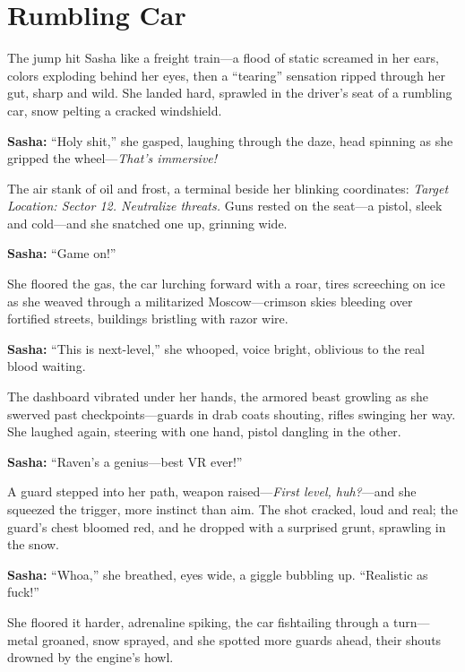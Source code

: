 \documentclass[12pt]{book}
\begin{document}
\section{Rumbling Car}

The jump hit Sasha like a freight train—a flood of static screamed in her ears, colors exploding behind her eyes, then a “tearing” sensation ripped through her gut, sharp and wild. She landed hard, sprawled in the driver’s seat of a rumbling car, snow pelting a cracked windshield. 

\vspace{0.5em}
\textbf{Sasha:} “Holy shit,” she gasped, laughing through the daze, head spinning as she gripped the wheel—\emph{That’s immersive!}

The air stank of oil and frost, a terminal beside her blinking coordinates: \emph{Target Location: Sector 12. Neutralize threats.} Guns rested on the seat—a pistol, sleek and cold—and she snatched one up, grinning wide. 

\vspace{0.5em}
\textbf{Sasha:} “Game on!”

She floored the gas, the car lurching forward with a roar, tires screeching on ice as she weaved through a militarized Moscow—crimson skies bleeding over fortified streets, buildings bristling with razor wire. 

\vspace{0.5em}
\textbf{Sasha:} “This is next-level,” she whooped, voice bright, oblivious to the real blood waiting.

The dashboard vibrated under her hands, the armored beast growling as she swerved past checkpoints—guards in drab coats shouting, rifles swinging her way. She laughed again, steering with one hand, pistol dangling in the other. 

\vspace{0.5em}
\textbf{Sasha:} “Raven’s a genius—best VR ever!”

A guard stepped into her path, weapon raised—\emph{First level, huh?}—and she squeezed the trigger, more instinct than aim. The shot cracked, loud and real; the guard’s chest bloomed red, and he dropped with a surprised grunt, sprawling in the snow. 

\vspace{0.5em}
\textbf{Sasha:} “Whoa,” she breathed, eyes wide, a giggle bubbling up. “Realistic as fuck!”

She floored it harder, adrenaline spiking, the car fishtailing through a turn—metal groaned, snow sprayed, and she spotted more guards ahead, their shouts drowned by the engine’s howl.
\end{document}
